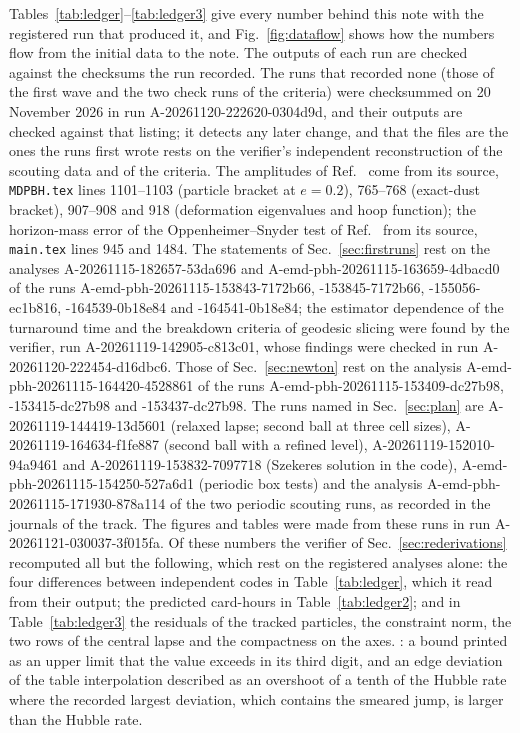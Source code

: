 \documentclass[aps,prd,twocolumn,10pt,superscriptaddress,nofootinbib,longbibliography,floatfix]{revtex4-2}
\begin{document}
Tables~\ref{tab:ledger}--\ref{tab:ledger3} give every number behind this note with the registered run that produced it, and Fig.~\ref{fig:dataflow} shows how the numbers flow from the initial data to the note. The outputs of each run are checked against the checksums the run recorded. The runs that recorded none (those of the first wave and the two check runs of the criteria) were checksummed on 20 November 2026 in run A-20261120-222620-0304d9d, and their outputs are checked against that listing; it detects any later change, and that the files are the ones the runs first wrote rests on the verifier's independent reconstruction of the scouting data and of the criteria. The amplitudes of Ref.~\cite{Yoo:2026mdpbh} come from its source, \texttt{MDPBH.tex} lines 1101--1103 (particle bracket at $e=0.2$), 765--768 (exact-dust bracket), 907--908 and 918 (deformation eigenvalues and hoop function); the horizon-mass error of the Oppenheimer--Snyder test of Ref.~\cite{Wu:2026nrpic} from its source, \texttt{main.tex} lines 945 and 1484. The statements of Sec.~\ref{sec:firstruns} rest on the analyses A-20261115-182657-53da696 and A-emd-pbh-20261115-163659-4dbacd0 of the runs A-emd-pbh-20261115-153843-7172b66, \mbox{-153845-7172b66}, \mbox{-155056-ec1b816}, \mbox{-164539-0b18e84} and \mbox{-164541-0b18e84}; the estimator dependence of the turnaround time and the breakdown criteria of geodesic slicing were found by the verifier, run A-20261119-142905-c813c01, whose findings were checked in run A-20261120-222454-d16dbc6. Those of Sec.~\ref{sec:newton} rest on the analysis A-emd-pbh-20261115-164420-4528861 of the runs A-emd-pbh-20261115-153409-dc27b98, \mbox{-153415-dc27b98} and \mbox{-153437-dc27b98}. The runs named in Sec.~\ref{sec:plan} are A-20261119-144419-13d5601 (relaxed lapse; second ball at three cell sizes), A-20261119-164634-f1fe887 (second ball with a refined level), A-20261119-152010-94a9461 and A-20261119-153832-7097718 (Szekeres solution in the code), A-emd-pbh-20261115-154250-527a6d1 (periodic box tests) and the analysis A-emd-pbh-20261115-171930-878a114 of the two periodic scouting runs, as recorded in the journals of the track. The figures and tables were made from these runs in run A-20261121-030037-3f015fa. Of these numbers the verifier of Sec.~\ref{sec:rederivations} recomputed all but the following, which rest on the registered analyses alone: the four differences between independent codes in Table~\ref{tab:ledger}, which it read from their output; the predicted card-hours in Table~\ref{tab:ledger2}; and in Table~\ref{tab:ledger3} the residuals of the tracked particles, the constraint norm, the two rows of the central lapse and the compactness on the axes. : a bound printed as an upper limit that the value exceeds in its third digit, and an edge deviation of the table interpolation described as an overshoot of a tenth of the Hubble rate where the recorded largest deviation, which contains the smeared jump, is larger than the Hubble rate.
\end{document}
